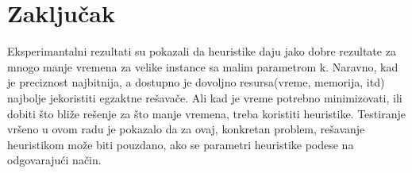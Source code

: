 \documentclass[a4paper]{article}
\begin{document}
\section{Zaključak}

Eksperimantalni rezultati su pokazali da heuristike daju jako dobre rezultate za mnogo manje vremena za velike instance sa malim parametrom k. Naravno, kad je preciznost najbitnija, a dostupno je dovoljno resursa(vreme, memorija, itd) najbolje jekoristiti egzaktne rešavače. Ali kad je vreme potrebno minimizovati, ili dobiti što bliže rešenje za što manje vremena, treba koristiti heuristike. Testiranje vršeno u ovom radu je pokazalo da za ovaj, konkretan problem, rešavanje heuristikom može biti pouzdano, ako se parametri heuristike podese na odgovarajući način.

\appendix
 

\end{document}

